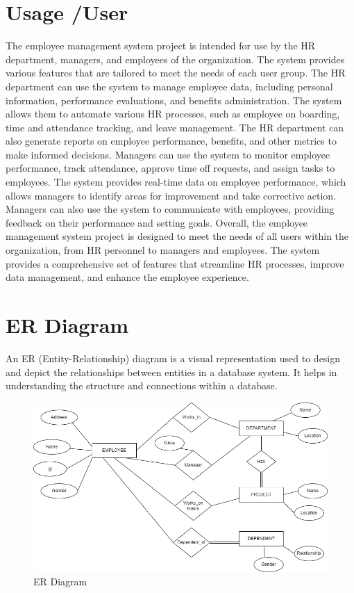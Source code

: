 \documentclass{article}
\begin{document}
\section{Usage /User}
The employee management system project is intended for use by the HR
department, managers, and employees of the organization. The system
provides various features that are tailored to meet the needs of each
user group.
The HR department can use the system to manage employee data,
including personal information, performance evaluations, and benefits
administration. The system allows them to automate various HR
processes, such as employee on boarding, time and attendance tracking,
and leave management. The HR department can also generate reports
on employee performance, benefits, and other metrics to make
informed decisions.
Managers can use the system to monitor employee performance, track
attendance, approve time off requests, and assign tasks to employees.
The system provides real-time data on employee performance, which
allows managers to identify areas for improvement and take corrective
action. Managers can also use the system to communicate with
employees, providing feedback on their performance and setting goals.
Overall, the employee management system project is designed to meet
the needs of all users within the organization, from HR personnel to
managers and employees. The system provides a comprehensive set of
features that streamline HR processes, improve data management, and
enhance the employee experience.
\newpage
\section{ER Diagram}
An ER (Entity-Relationship) diagram is a visual representation used to
design and depict the relationships between entities in a database
system. It helps in understanding the structure and connections within
a database.
\begin{figure}[h]
    \centering
    \includegraphics[width=12cm]{img/erdiagram.png}
    \caption{ER Diagram}
    
\end{figure}
\end{document}
